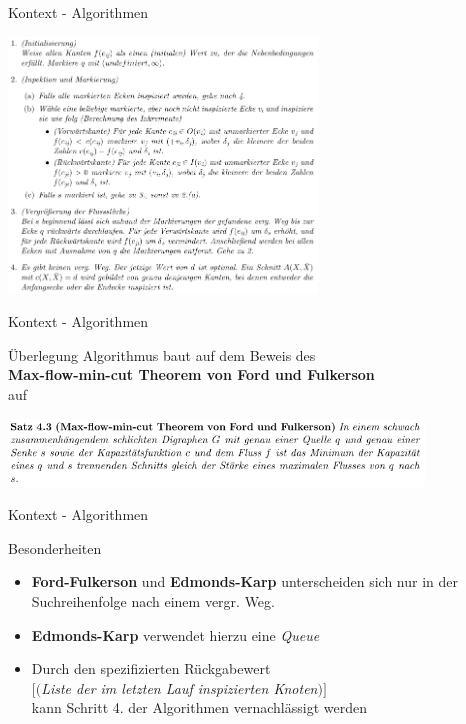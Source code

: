 \documentclass{beamer}
\begin{document}
    \begin{frame}{Kontext - Algorithmen}
        \begin{center}
            \includegraphics[height=6.8cm]{../algorithmus.PNG}
        \end{center}
    \end{frame}

    \begin{frame}{Kontext - Algorithmen}
        \begin{block}{\"Uberlegung}
            Algorithmus baut auf dem Beweis des\\ \textbf{Max-flow-min-cut Theorem von Ford und Fulkerson}\\ auf
        \end{block}

        \begin{center}
            \includegraphics[height=1.8cm]{../max-flow-min-cut.PNG}
        \end{center}
    \end{frame}

    \begin{frame}{Kontext - Algorithmen}
        \begin{block}{Besonderheiten}
            \begin{itemize}
                \item \textbf{Ford-Fulkerson} und \textbf{Edmonds-Karp} unterscheiden sich nur in der Suchreihenfolge nach einem vergr. Weg.
                \item \textbf{Edmonds-Karp} verwendet hierzu eine \textit{Queue}
                \item Durch den spezifizierten R\"uckgabewert\\
                $[($\textit{Liste der im letzten Lauf inspizierten Knoten}$)]$\\
                kann Schritt 4. der Algorithmen vernachl\"assigt werden
            \end{itemize}
        \end{block}
    \end{frame}
\end{document}
